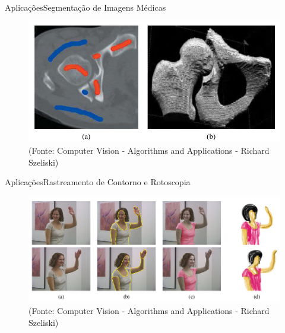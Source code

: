 \begin{frame}{Aplicações}{Segmentação de Imagens Médicas}

\begin{figure}
    \centering
    \includegraphics[scale=.4]{img/medical_image_segmentation.png}
    \\ (Fonte: Computer Vision - Algorithms and Applications - Richard Szeliski)
    \label{fig:medical_image_segmentation}
\end{figure}

\end{frame}

\begin{frame}{Aplicações}{Rastreamento de Contorno e Rotoscopia}

\begin{figure}
    \centering
    \includegraphics[scale=.6]{img/contour_trackin_rotoscoping.png}
    \\ (Fonte: Computer Vision - Algorithms and Applications - Richard Szeliski)
    \label{fig:contour_tracking_rotoscoping}
\end{figure}

\end{frame}

